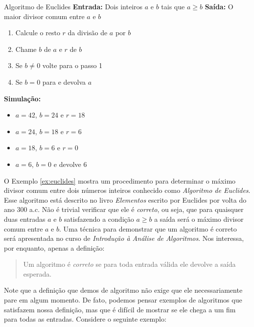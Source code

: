 \begin{example}{Algoritmo de Euclides}
  \label{ex:euclides}
  {\bf Entrada:} Dois inteiros $a$ e $b$ tais que $a \geq b$
  {\bf Saída:} O maior divisor comum entre $a$ e $b$

  \begin{enumerate}
  \item Calcule o resto $r$ da divisão de $a$ por $b$
  \item Chame $b$ de $a$ e $r$ de $b$
  \item Se $b \neq 0$ volte para o passo 1
  \item Se $b = 0$ para e devolva $a$
  \end{enumerate}

  {\bf Simulação:}
  \begin{itemize}
  \item $a = 42$, $b = 24$ e $r = 18$
  \item $a = 24$, $b = 18$ e $r = 6$
  \item $a = 18$, $b = 6$ e $r = 0$
  \item $a = 6$, $b = 0$ e devolve $6$
  \end{itemize}
\end{example}

O Exemplo \ref{ex:euclides} mostra um procedimento para determinar o máximo divisor comum entre dois números inteiros conhecido como {\em Algoritmo de Euclides}.
Esse algoritmo está descrito no livro {\em Elementos} escrito por Euclides por volta do ano 300 a.c.
Não é trivial verificar que ele é {\em correto}, ou seja, que para quaisquer duas entradas $a$ e $b$ satisfazendo a condição $a \geq b$ a saída será o máximo divisor comum entre $a$ e $b$.
Uma técnica para demonstrar que um algoritmo é correto será apresentada no curso de {\em Introdução à Análise de Algoritmos}.
Nos interessa, por enquanto, apenas a definição:

\begin{quote}
  Um algoritmo é {\em correto} se para toda entrada válida ele devolve a saída esperada.
\end{quote}

Note que a definição que demos de algoritmo não exige que ele necessariamente pare em algum momento.
De fato, podemos pensar exemplos de algoritmos que satisfazem nossa definição, mas que é difícil de mostrar se ele chega a um fim para todas as entradas.
Considere o seguinte exemplo:

